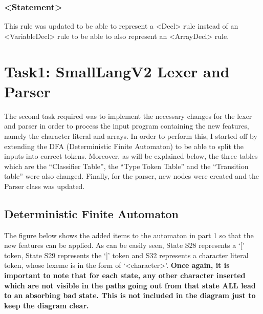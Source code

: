 \documentclass{article}
\newcommand{\quotes}[1]{``#1''}
\begin{document}
				\subsubsection{\textless Statement\textgreater}
				
				This rule was updated to be able to represent a \textless Decl\textgreater{} rule instead of an \textless VariableDecl\textgreater{} rule to be able to also represent an \textless ArrayDecl\textgreater{} rule.
				
				
				\section{Task1: SmallLangV2 Lexer and Parser}
				
				The second task required was to implement the necessary changes for the lexer and parser in order to process the input program containing the new features, namely the character literal and arrays. In order to perform this, I started off by extending the DFA (Deterministic Finite Automaton) to be able to split the inputs into correct tokens. Moreover, as will be explained below, the three tables which are the \quotes{Classifier Table}, the \quotes{Type Token Table} and the \quotes{Transition table} were also changed. Finally, for the parser, new nodes were created and the Parser class was updated. 
				
				\subsection{Deterministic Finite Automaton}
				
				The figure below shows the added items to the automaton in part 1 so that the new features can be applied. As can be easily seen, State S28 represents a `[' token, State S29 represents the `]' token and S32 represents a character literal token, whose lexeme is in the form of `\textless character\textgreater'. \textbf{Once again, it is important to note that for each state, any other character inserted which are not visible in the paths going out from that state ALL lead to an absorbing bad state. This is not included in the diagram just to keep the diagram clear.}
				
\end{document}
